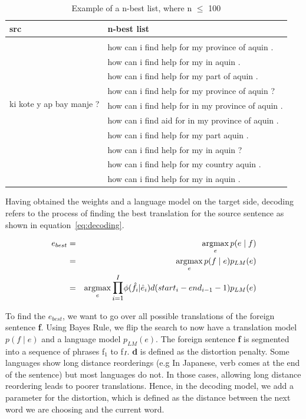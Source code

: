 \begin{table}
	\begin{tabular}{p{}p{}}
		\toprule
		src & n-best list \\
		\toprule
		\multirow{10}{*}{ki kote y ap bay manje ?}  & \\ 
		& how can i find help for my province of aquin . \\
		& how can i find help for my in aquin . \\
		& how can i find help for my part of aquin . \\
		& how can i find help for my province of aquin ? \\
		& how can i find help for in my province of aquin . \\
		& how can i find aid for in my province of aquin . \\
		& how can i find help for my part aquin . \\
		& how can i find help for my in aquin ?  \\
		& how can i find help for my country aquin . \\
		& how can i find help for my in aquin . \\
		\bottomrule
	\end{tabular}
	\caption{Example of a n-best list, where n $\leq$ 100}
	\label{table:nbest}
\end{table}



Having obtained the weights and a language model on the target side, decoding refers to the process of finding the best translation for the source sentence as shown in equation~\eqref{eq:decoding}. 

\begin{eqnarray*} \label{eq:decoding}
	e_{best} &=& \argmax_{e} p(e \mid f) \\
			 &=& \argmax_{e} p(f \mid e)p_{LM}(e) \\
			 &=& \argmax_{e} \mathlarger{\prod\limits_{i=1}^I} \phi(\hat{f}_{i} | \hat{e}_{i})d(start_{i} - end_{i-1}-1)p_{LM}(e)
\end{eqnarray*}


To find the $e_{best}$, we want to go over all possible translations of the foreign sentence \textbf{f}. Using Bayes Rule, we flip the search to now have a translation model $p(f \mid e)$ and a language model $p_{LM}(e)$. The foreign sentence \textbf{f} is segmented into a sequence of phrases f$_{1}$ to f$_\emph{I}$. \textbf{d} is defined as the distortion penalty. Some languages show long distance reorderings (e.g In Japanese, verb comes at the end of the sentence) but most languages do not. In those cases, allowing long distance reordering leads to poorer translations. Hence, in the decoding model, we add a parameter for the distortion, which is defined as the distance between the next word we are choosing and the current word. 


